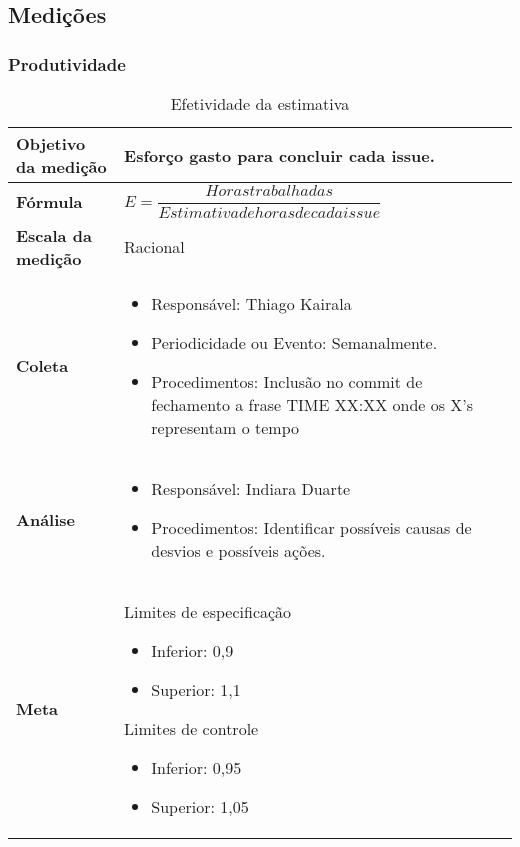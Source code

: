 \subsection{Medições}

\subsubsection{Produtividade}

\begin{table}[H]
\centering
\begin{tabular}{|p{4cm}|p{7cm}|}
\hline
	\textbf{Objetivo da medição} &
	Esforço gasto para concluir cada issue.
	\\ \hline
	\textbf{Fórmula} &
	$E = \dfrac{Horas trabalhadas}{Estimativa de horas de cada issue}$
	\\ \hline
	\textbf{Escala da medição} &
	Racional
	\\ \hline
	\textbf{Coleta} &
	\begin{itemize}
		\item{Responsável: Thiago Kairala}
		\item{Periodicidade ou Evento: Semanalmente.}
		\item{Procedimentos: Inclusão no commit de fechamento a frase TIME XX:XX onde os X's representam o tempo}
	\end{itemize}
	\\ \hline
	\textbf{Análise} &
	\begin{itemize}
		\item Responsável: Indiara Duarte
		\item Procedimentos: Identificar possíveis causas de desvios e possíveis ações.
	\end{itemize}
	\\ \hline
	\textbf{Meta} &
	Limites de especificação
		\begin{itemize}
			\item Inferior: 0,9
			\item Superior: 1,1
		\end{itemize}
	Limites de controle
		\begin{itemize}
			\item Inferior: 0,95
			\item Superior: 1,05
		\end{itemize}
  \\ \hline
\end{tabular}
\caption{Efetividade da estimativa}
\label{tab:efetividade_estimativa}
\end{table}

